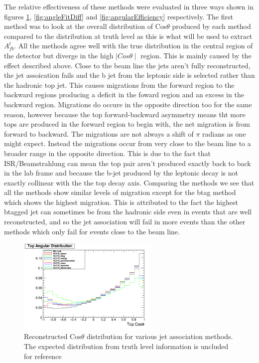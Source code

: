 The relative effectiveness of these methods were evaluated in three ways shown in figures \ref{fig:methodComparison}, \ref{fig:angleFitDiff} and \ref{fig:angularEfficiency} respectively. The first method was to look at the overall distribution of Cos$\theta$ produced by each method compared to the distribution at truth level as this is what will be used to extract $A_{fb}^{t}$. All the methods agree well with the true distribution in the central region of the detector but diverge in the high $\mid Cos\theta\mid$ region. This is mainly caused by the effect described above. Close to the beam line the jets aren't fully reconstructed, the jet assoication fails and the b jet from the leptonic side is selected rather than the hadronic top jet. This causes migrations from the forward region to the backward regions producing a deficit in the foward region and an excess in the backward region. Migrations do occure in the opposite direction too for the same reason, however because the top forward-backward asymmetry means tht more tops are produced in the forward region to begin with, the net migration is from forward to backward. The migrations are not always a shift of $\pi$ radians as one might expect. Instead the migrations occur from very close to the beam line to a broader range in the opposite direction. This is due to the fact that ISR/Beamstrahlung can mean the top pair aren't produced exactly back to back in the lab frame and because the b-jet produced by the leptonic decay is not exactly collinear with the the top decay axis. Comparing the methods we see that all the methods show similar levels of migration except for the btag method which shows the highest migration. This is attributed to the fact the highest btagged jet can sometimes be from the hadronic side even in events that are well reconstructed, and so the jet association will fail in more events than the other methods which only fail for events close to the beam line.

\begin{figure}
  \centering
  \includegraphics[width=0.6\textwidth]{TopAnalysis/figures/comparejetmethods.png}
  \caption[Reconstructed Cos$\theta$ distribution for various jet association methods]{Reconstructed Cos$\theta$ distribution for various jet association methods. The expected distribution from truth level information is uncluded for reference}
  \label{fig:methodComparison}
\end{figure}

